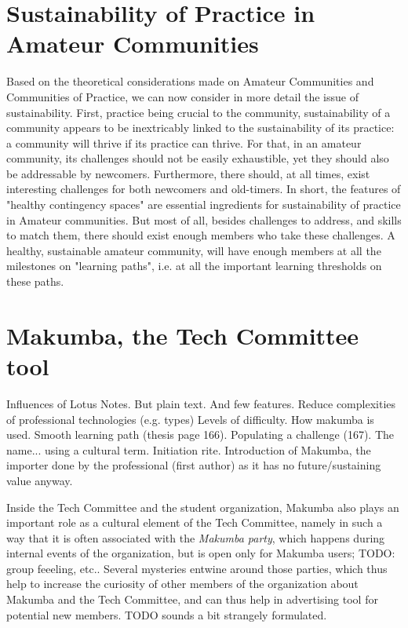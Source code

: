 \documentclass{acm_proc_article-sp}
\begin{document}
\section{Sustainability of Practice in Amateur Communities}\label{sec:sust}
Based on the theoretical considerations made on Amateur Communities and Communities of Practice, we can now consider in more detail the issue of sustainability. First, practice being crucial to the community, sustainability of a community appears to be inextricably linked to the sustainability of its practice: a community will thrive if its practice can thrive. For that, in an amateur community, its challenges should not be easily exhaustible, yet they should also be addressable by newcomers. Furthermore, there should, at all times, exist interesting challenges for both newcomers and old-timers. In short, the features of "healthy contingency spaces" are essential ingredients for sustainability of practice in Amateur communities. But most of all, besides challenges to address, and skills to match them, there should exist enough members who take these challenges. A healthy, sustainable amateur community, will have enough members at all the milestones on "learning paths", i.e. at all the important learning thresholds on these paths.

\section{Makumba, the Tech Committee tool}\label{sec:makumba}

Influences of Lotus Notes.
But plain text.
And few features.
Reduce complexities of professional technologies (e.g. types)
Levels of difficulty. How makumba is used. Smooth learning path (thesis page 166).
Populating a challenge (167).
The name... using a cultural term. Initiation rite. 
Introduction of Makumba, the importer done by the professional (first author) as it has no future/sustaining value anyway.

Inside the Tech Committee and the student organization, Makumba also plays an important role as a cultural element of the Tech Committee, namely in such a way that it is often associated with the \textit{Makumba party}, which happens during internal events of the organization, but is open only for Makumba users; TODO: group feeeling, etc.. 
Several mysteries entwine around those parties, which thus help to increase the curiosity of other members of the organization about Makumba and the Tech Committee, and can thus help in advertising tool for potential new members. TODO sounds a bit strangely formulated.
\end{document}
